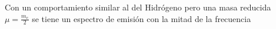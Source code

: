 \documentclass[preview]{standalone}
\begin{document}
\begin{center}
\begin{flushleft}
                      Con un comportamiento similar al del Hidrógeno
                      pero una masa reducida \\$\mu = \frac{m_e}{2}$ se 
                      tiene un espectro de emisión con la mitad de 
                      la frecuencia
                      \end{flushleft}
\end{center}
\end{document}
